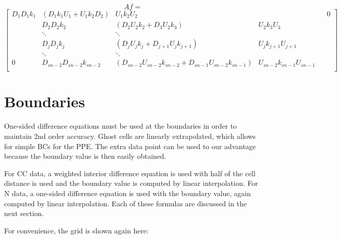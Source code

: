 \documentclass[11pt]{article}
\begin{document}
\begin{equation}
  Af = 
\end{equation}
\[
\left[
\begin{array}{ccccccccc}
D_1D_1k_1&(D_1k_1U_1+U_1k_2D_2) &U_1k_2U_2          &           &                             &                    0                      \\
         &D_2D_2k_2           &(D_2U_2k_2+D_3U_2k_3)&U_2k_3U_3  &                             &                                         \\
         &\ddots             &\ddots     &                             &                    &                                         \\
         &D_j D_j k_j&(D_jU_jk_j+D_{j+1}U_{j}k_{j+1})&U_jk_{j+1}U_{j+1}   &                                         \\
         &\ddots                       &\ddots              &                                         \\
0        &D_{sn-2} D_{sn-2} k_{sn-2}&(D_{sn-2}U_{sn-2}k_{sn-2}+D_{sn-1}U_{sn-2}k_{sn-1})&U_{sn-2}k_{sn-1}U_{sn-1}   &                                         \\
\end{array}
\right]
\]


\section{Boundaries}
One-sided difference equations must be used at the boundaries in order to maintain 2nd order accuracy. Ghost cells are linearly extrapolated, which allows for simple BCs for the PPE. The extra data point can be used to our advantage because the boundary value is then easily obtained.

For CC data, a weighted interior difference equation is used with half of the cell distance is used and the boundary value is computed by linear interpolation. For N data, a one-sided difference equation is used with the boundary value, again computed by linear interpolation. Each of these formulas are discussed in the next section.

For convenience, the grid is shown again here:
\end{document}
